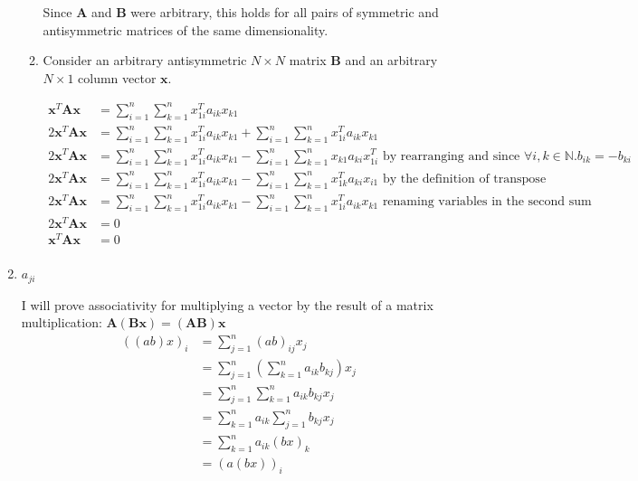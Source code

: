 \documentclass[10pt,oneside,a4paper]{article}
\begin{document}
\begin{enumerate}
\begin{enumerate}
Since $\mathbf{A}$ and $\mathbf{B}$ were arbitrary, this holds for all pairs of symmetric and antisymmetric matrices 
of the same dimensionality.

\item 

Consider an arbitrary antisymmetric $N \times N$ matrix $\mathbf{B}$ and an arbitrary $N \times 1$ column vector $\mathbf{x}$.

\[
\begin{split}
\mathbf{x}^T\mathbf{A}\mathbf{x} &= \sum^n_{i=1}\sum^n_{k=1} x^T_{1i}a_{ik}x_{k1} \\
2\mathbf{x}^T\mathbf{A}\mathbf{x} &= \sum^n_{i=1}\sum^n_{k=1} x^T_{1i}a_{ik}x_{k1} + \sum^n_{i=1}\sum^n_{k=1} x^T_{1i}a_{ik}x_{k1} \\
2\mathbf{x}^T\mathbf{A}\mathbf{x} &= \sum^n_{i=1}\sum^n_{k=1} x^T_{1i}a_{ik}x_{k1} - \sum^n_{i=1}\sum^n_{k=1} x_{k1}a_{ki}x^T_{1i} \text{ by rearranging and since } \forall i, k \in \mathbb{N}. b_{ik} = -b_{ki} \\
2\mathbf{x}^T\mathbf{A}\mathbf{x} &= \sum^n_{i=1}\sum^n_{k=1} x^T_{1i}a_{ik}x_{k1} - \sum^n_{i=1}\sum^n_{k=1} x^T_{1k}a_{ki}x_{i1} \text{ by the definition of transpose}\\
2\mathbf{x}^T\mathbf{A}\mathbf{x} &= \sum^n_{i=1}\sum^n_{k=1} x^T_{1i}a_{ik}x_{k1} - \sum^n_{i=1}\sum^n_{k=1} x^T_{1i}a_{ik}x_{k1} \text{ renaming variables in the second sum}\\
2\mathbf{x}^T\mathbf{A}\mathbf{x} &= 0 \\
\mathbf{x}^T\mathbf{A}\mathbf{x} &= 0 \\
\end{split}
\]

\end{enumerate}

\item $a_{ji}$

I will prove associativity for multiplying a vector by the result of a matrix multiplication: $\mathbf{A}(\mathbf{Bx}) = (\mathbf{AB})\mathbf{x}$
\begin{equation}\label{eq:associative}
\begin{split}
((ab)x)_{i} &= \sum^n_{j=1} (ab)_{ij}x_j \\
            &= \sum^n_{j=1} \left(\sum^n_{k=1} a_{ik}b_{kj}\right)x_j \\
            &= \sum^n_{j=1} \sum^n_{k=1} a_{ik}b_{kj}x_j \\
            &= \sum^n_{k=1} a_{ik} \sum^n_{j=1} b_{kj}x_j \\
            &= \sum^n_{k=1} a_{ik} (bx)_k \\
            &= (a(bx))_i \\
\end{split}
\end{equation}


\end{enumerate}
\end{document}
